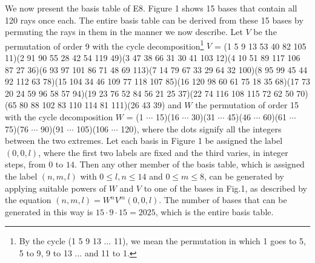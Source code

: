 We now present the basis table of E8. Figure 1 shows 15 bases that contain all 120 rays once each. The entire basis table can be derived from these 15 bases by permuting the rays in them in the manner we now describe. Let $V$ be the permutation of order 9 with the cycle decomposition\footnote{By the cycle (1 5 9 13 ... 11), we mean the permutation in which 1 goes to 5, 5 to 9, 9 to 13 ... and 11 to 1.} $V$ = (1 5 9 13 53 40 82 105 11)(2 91 90 55 28 42 54 119 49)(3 47 38 66 31 30 41 103 12)(4 10 51 89 117 106 87 27 36)(6 93 97 101 86 71 48 69 113)(7 14 79 67 33 29 64 32 100)(8 95 99 45 44 92 112 63 78)(15 104 34 46 109 77 118 107 85)(16 120 98 60 61 75 18 35 68)(17 73 20 24 59 96 58 57 94)(19 23 76 52 84 56 21 25 37)(22 74 116 108 115 72 62 50 70)(65 80 88 102 83 110 114 81 111)(26 43 39) and $W$ the permutation of order 15 with the cycle decomposition $W$ = (1 $\cdots$ 15)(16 $\cdots$ 30)(31 $\cdots$ 45)(46 $\cdots$ 60)(61 $\cdots$ 75)(76 $\cdots$ 90)(91 $\cdots$ 105)(106 $\cdots$ 120), where the dots signify all the integers between the two extremes. Let each basis in Figure 1 be assigned the label $(0,0,l)$, where the first two labels are fixed and the third varies, in integer steps, from $0$ to $14$. Then any other member of the basis table, which is assigned the label $(n,m,l)$ with $0\leq l,n \leq 14$ and $0 \leq m \leq 8$, can be generated by applying suitable powers of $W$ and $V$ to one of the bases in Fig.1, as described by the equation $(n,m,l) = W^{n}V^{m}(0,0,l)$. The number of bases that can be generated in this way is $15\cdot 9 \cdot 15 = 2025$, which is the entire basis table.\\

